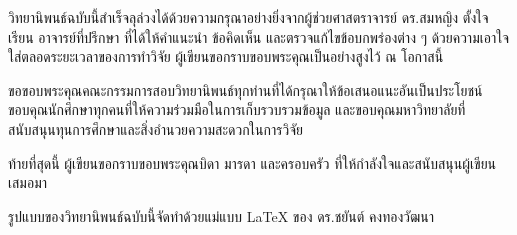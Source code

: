 \begin{acknowledgements}
วิทยานิพนธ์ฉบับนี้สำเร็จลุล่วงได้ด้วยความกรุณาอย่างยิ่งจากผู้ช่วยศาสตราจารย์ ดร.สมหญิง ตั้งใจเรียน อาจารย์ที่ปรึกษา ที่ได้ให้คำแนะนำ ข้อคิดเห็น และตรวจแก้ไขข้อบกพร่องต่าง ๆ ด้วยความเอาใจใส่ตลอดระยะเวลาของการทำวิจัย ผู้เขียนขอกราบขอบพระคุณเป็นอย่างสูงไว้ ณ โอกาสนี้

ขอขอบพระคุณคณะกรรมการสอบวิทยานิพนธ์ทุกท่านที่ได้กรุณาให้ข้อเสนอแนะอันเป็นประโยชน์ ขอบคุณนักศึกษาทุกคนที่ให้ความร่วมมือในการเก็บรวบรวมข้อมูล และขอบคุณมหาวิทยาลัยที่สนับสนุนทุนการศึกษาและสิ่งอำนวยความสะดวกในการวิจัย

ท้ายที่สุดนี้ ผู้เขียนขอกราบขอบพระคุณบิดา มารดา และครอบครัว ที่ให้กำลังใจและสนับสนุนผู้เขียนเสมอมา

รูปแบบของวิทยานิพนธ์ฉบับนี้จัดทำด้วยแม่แบบ LaTeX ของ ดร.ชยันต์ คงทองวัฒนา~\cite{kongtongvattana2026thaithesis}
\end{acknowledgements}
